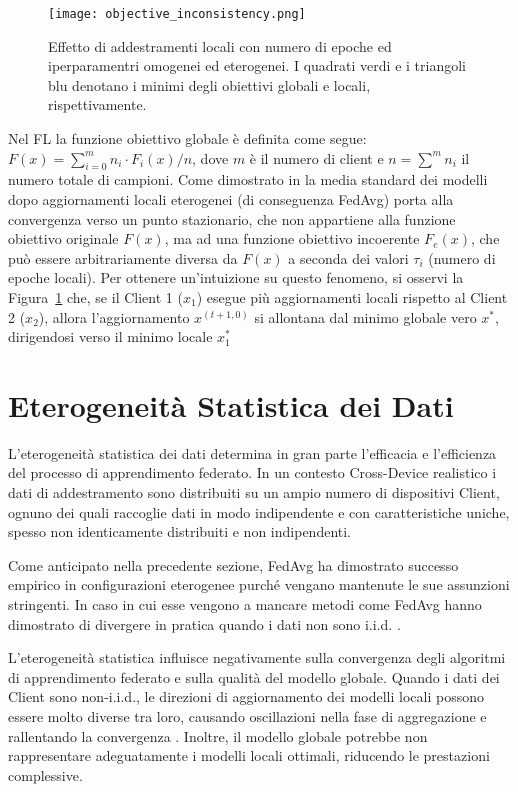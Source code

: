 \documentclass[a4paper, oneside, openright]{report}
\let\oldsection\section
\renewcommand{\section}{\newpage\oldsection}
\begin{document}
\begin{figure}[h]
\centering
\texttt{[image: objective\_inconsistency.png]}
\caption{Effetto di addestramenti locali con numero di epoche ed iperparamentri omogenei ed eterogenei. I quadrati verdi e i triangoli blu denotano i minimi degli obiettivi globali e locali, rispettivamente.} \label{fig:objective_inconsistency}
\end{figure}

Nel FL la funzione obiettivo globale è definita come segue: $F(x) = \sum_{i=0}^m{n_i \cdot F_i(x)/n}$, dove $m$ è il numero di client e $n=\sum^m{n_i}$ il numero totale di campioni. Come dimostrato in \cite{DBLP:journals/corr/abs-2007-07481} la media standard dei modelli dopo aggiornamenti locali eterogenei (di conseguenza FedAvg) porta alla convergenza verso un punto stazionario, che non appartiene alla funzione obiettivo originale $F(x)$, ma ad una funzione obiettivo incoerente $F_e(x)$, che può essere arbitrariamente diversa da $F(x)$ a seconda dei valori $\tau_i$ (numero di epoche locali).
\newline
\newline
Per ottenere un'intuizione su questo fenomeno, si osservi la Figura~\ref{fig:objective_inconsistency} che, se il Client 1 ($x_1$) esegue più aggiornamenti locali rispetto al Client 2 ($x_2$), allora l'aggiornamento $x^{(t+1,0)}$ si allontana dal minimo globale vero $x^*$, dirigendosi verso il minimo locale $x_1^*$


\section{Eterogeneità Statistica dei Dati}
L'eterogeneità statistica dei dati determina in gran parte l'efficacia e l'efficienza del processo di apprendimento federato. In un contesto Cross-Device realistico i dati di addestramento sono distribuiti su un ampio numero di dispositivi Client, ognuno dei quali raccoglie dati in modo indipendente e con caratteristiche uniche, spesso non identicamente distribuiti e non indipendenti.

Come anticipato nella precedente sezione, FedAvg ha dimostrato successo empirico in configurazioni eterogenee purché vengano mantenute le sue assunzioni stringenti. In caso in cui esse vengono a mancare metodi come FedAvg hanno dimostrato di divergere in pratica quando i dati non sono i.i.d. \cite{DBLP:journals/corr/abs-1812-06127}.

L'eterogeneità statistica influisce negativamente sulla convergenza degli algoritmi di apprendimento federato e sulla qualità del modello globale. Quando i dati dei Client sono non-i.i.d., le direzioni di aggiornamento dei modelli locali possono essere molto diverse tra loro, causando oscillazioni nella fase di aggregazione e rallentando la convergenza \cite{DBLP:journals/corr/abs-1806-00582}. Inoltre, il modello globale potrebbe non rappresentare adeguatamente i modelli locali ottimali, riducendo le prestazioni complessive.
\end{document}

